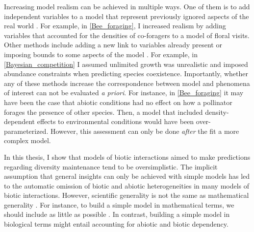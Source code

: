 \begin{refsection}
Increasing model realism can be achieved in multiple ways. One of them is to add independent variables to a model that represent previously ignored aspects of the real world \citep{orzack1993critical, evans2013simple}. For example, in \autoref{Bee_foraging}, I increased realism by adding variables that accounted for the densities of co-foragers to a model of floral visits. Other methods include adding a new link to variables already present or imposing bounds to some aspects of the model \citep{levins1993response}. For example, in \autoref{Bayesian_competition} I assumed unlimited growth was unrealistic and imposed abundance constraints when predicting species coexistence. Importantly, whether any of these methods increase the correspondence between model and phenomena of interest can not be evaluated \textit{a priori}. For instance, in  \autoref{Bee_foraging} it may have been the case that abiotic conditions had no effect on how a pollinator forages the presence of other species. Then, a model that included density-dependent effects to environmental conditions would have been over-parameterized. However, this assessment can only be done \textit{after} the fit a more complex model.


In this thesis, I show that models of biotic interactions aimed to make predictions regarding diversity maintenance tend to be oversimplistic. The implicit assumption that general insights can only be achieved with simple models \citep{holling1966strategy,may2019stability,roughgarden2018adaptive} has led to the automatic omission of biotic and abiotic heterogeneities in many models of biotic interactions. However, scientific generality is not the same as mathematical generality \citep{levins1993response}.  For instance, to build a simple model in mathematical terms, we should include as little as possible \citep{orzack2012philosophy}. In contrast, building a simple model in biological terms might entail accounting for abiotic and biotic dependency.


\end{refsection}

